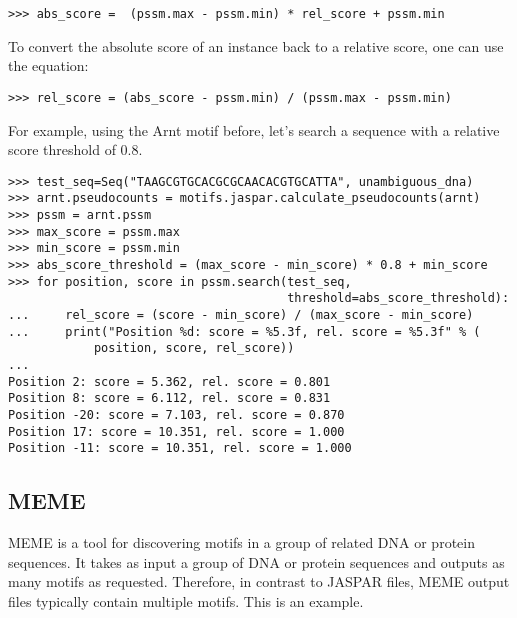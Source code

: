 \begin{itemize}
\begin{verbatim}
>>> abs_score =  (pssm.max - pssm.min) * rel_score + pssm.min
\end{verbatim}
To convert the absolute score of an instance back to a relative score, one can use the equation:
\begin{verbatim}
>>> rel_score = (abs_score - pssm.min) / (pssm.max - pssm.min)
\end{verbatim}
For example, using the Arnt motif before, let's search a sequence with a relative score threshold of 0.8.
\begin{verbatim}
>>> test_seq=Seq("TAAGCGTGCACGCGCAACACGTGCATTA", unambiguous_dna)
>>> arnt.pseudocounts = motifs.jaspar.calculate_pseudocounts(arnt)
>>> pssm = arnt.pssm
>>> max_score = pssm.max
>>> min_score = pssm.min
>>> abs_score_threshold = (max_score - min_score) * 0.8 + min_score
>>> for position, score in pssm.search(test_seq,
                                       threshold=abs_score_threshold):
...     rel_score = (score - min_score) / (max_score - min_score)
...     print("Position %d: score = %5.3f, rel. score = %5.3f" % (
            position, score, rel_score))
...
Position 2: score = 5.362, rel. score = 0.801
Position 8: score = 6.112, rel. score = 0.831
Position -20: score = 7.103, rel. score = 0.870
Position 17: score = 10.351, rel. score = 1.000
Position -11: score = 10.351, rel. score = 1.000
\end{verbatim}
\end{itemize}

\subsection{MEME}

MEME \cite{bailey1994} is a tool for discovering motifs in a group of related
DNA or protein sequences. It takes as input a group of DNA or protein sequences
and outputs as many motifs as requested. Therefore, in contrast to JASPAR
files, MEME output files typically contain multiple motifs. This is an example.

